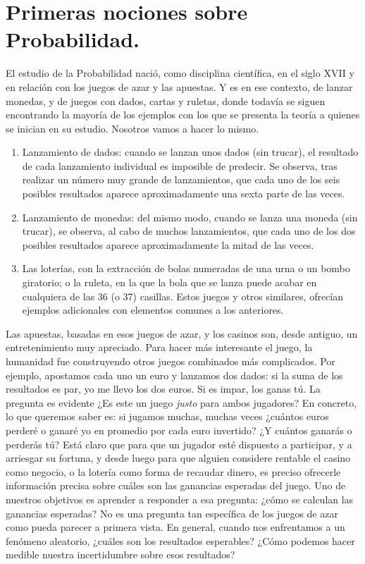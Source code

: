 
\section{Primeras nociones sobre Probabilidad.}
\label{cap03:sec:PrimerasNocionesProbabilidad}
\label{PrimerasNocionesProbabilidad}


El estudio de la Probabilidad nació, como disciplina científica, en el siglo XVII y en relación con los juegos de azar y las apuestas. Y es en ese contexto, de lanzar monedas, y de juegos con dados, cartas y ruletas, donde todavía se siguen encontrando la mayoría de los ejemplos con los que se presenta la teoría a quienes se inician en su estudio. Nosotros vamos a hacer lo mismo.
    \begin{enumerate}
        \item Lanzamiento de dados: cuando se lanzan unos dados (sin trucar), el resultado de cada lanzamiento individual es imposible de predecir. Se observa, tras realizar un número muy grande de lanzamientos, que cada uno de los seis posibles resultados aparece aproximadamente una sexta parte de las veces.
        \item Lanzamiento de monedas: del mismo modo, cuando se lanza una moneda (sin trucar), se observa, al cabo de muchos lanzamientos, que cada uno de los dos posibles resultados aparece aproximadamente la mitad de las veces.
        \item Las loterías, con la extracción de bolas numeradas de una urna o un bombo giratorio; o la ruleta, en la que la bola que se lanza puede acabar en cualquiera de las 36 (o 37) casillas.  Estos juegos y otros similares, ofrecían ejemplos adicionales con elementos comunes a los anteriores.
    \end{enumerate}
Las apuestas, basadas en esos juegos de azar, y los casinos son, desde antiguo, un entretenimiento muy apreciado. Para hacer más interesante el juego, la humanidad fue construyendo otros juegos combinados más complicados. Por ejemplo, apostamos cada uno un euro y lanzamos dos dados: si la suma de los resultados es par, yo me llevo los dos euros. Si es impar, los ganas tú. La pregunta es evidente ¿Es este un juego {\em justo} para ambos jugadores? En concreto, lo que queremos saber es: si jugamos muchas, muchas veces ¿cuántos euros perderé o ganaré yo en promedio por cada euro invertido? ¿Y cuántos ganarás o perderás tú? Está claro que para que un jugador esté dispuesto a participar, y a arriesgar su fortuna, y desde luego para que alguien considere rentable el casino como negocio, o la lotería como forma de recaudar dinero, es preciso ofrecerle {\sf información precisa sobre cuáles son las ganancias esperadas del juego}. Uno de nuestros objetivos es aprender a responder a esa pregunta: ¿cómo se calculan las ganancias esperadas? No es una pregunta tan específica de los juegos de azar como pueda parecer a primera vista. En general, cuando nos enfrentamos a un fenómeno aleatorio, ¿cuáles son los resultados esperables? ¿Cómo podemos hacer medible nuestra incertidumbre sobre esos resultados?

